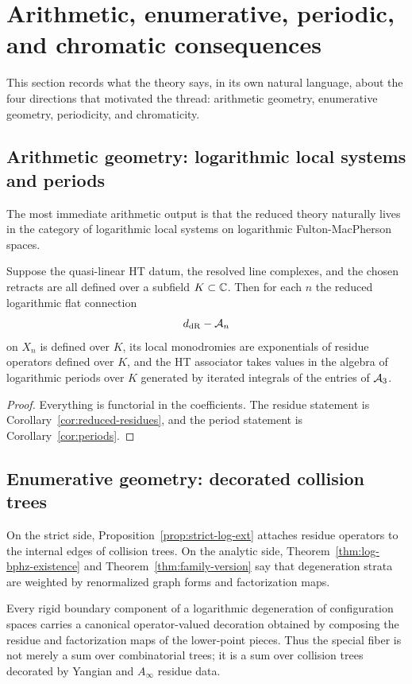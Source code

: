 \section{Arithmetic, enumerative, periodic, and chromatic consequences}%

This section records what the theory says, in its own natural language, about the four directions that motivated the thread: arithmetic geometry, enumerative geometry, periodicity, and chromaticity.

\subsection{Arithmetic geometry: logarithmic local systems and periods}
The most immediate arithmetic output is that the reduced theory naturally lives in the category of logarithmic local systems on logarithmic Fulton-MacPherson spaces.

\begin{proposition}%
Suppose the quasi-linear HT datum, the resolved line complexes, and the chosen retracts are all defined over a subfield $K\subset\mathbb C$. Then for each $n$ the reduced logarithmic flat connection
\[
 d_{\mathrm{dR}}-\mathcal A_n
\]
on $X_n$ is defined over $K$, its local monodromies are exponentials of residue operators defined over $K$, and the HT associator takes values in the algebra of logarithmic periods over $K$ generated by iterated integrals of the entries of $\mathcal A_3$.
\end{proposition}

\begin{proof}
Everything is functorial in the coefficients. The residue statement is Corollary~\ref{cor:reduced-residues}, and the period statement is Corollary~\ref{cor:periods}.
\end{proof}

\subsection{Enumerative geometry: decorated collision trees}
On the strict side, Proposition~\ref{prop:strict-log-ext} attaches residue operators to the internal edges of collision trees. On the analytic side, Theorem~\ref{thm:log-bphz-existence} and Theorem~\ref{thm:family-version} say that degeneration strata are weighted by renormalized graph forms and factorization maps.

\begin{proposition}%
Every rigid boundary component of a logarithmic degeneration of configuration spaces carries a canonical operator-valued decoration obtained by composing the residue and factorization maps of the lower-point pieces. Thus the special fiber is not merely a sum over combinatorial trees; it is a sum over collision trees decorated by Yangian and $A_\infty$ residue data.
\end{proposition}

